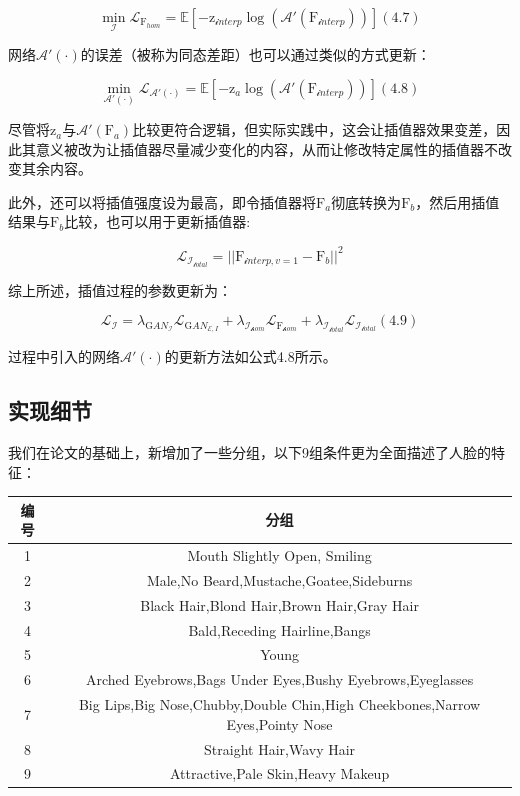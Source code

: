 \documentclass[UTF8,a4paper，12pt]{article}
\def\MC {\mathcal}
\theoremstyle{theorem}
\theoremstyle{definition}
\begin{document}
$$\min_ {\MC I} \MC L_{\mathrm F_{hom}} = \mathbb E [-\mathrm z_{\MC interp}\log(\MC A'(\mathrm F_{\MC interp}))]    (4.7)$$

网络$\MC A'(\cdot)$的误差（被称为同态差距）也可以通过类似的方式更新：

$$\min_ {\MC A'(\cdot)} \MC L_{\MC A'(\cdot)} = \mathbb E [-\mathrm z_a\log(\MC A'(\mathrm F_{\MC interp}))]    (4.8)$$

尽管将$\mathrm z_a$与$\MC A'(\mathrm F_a)$比较更符合逻辑，但实际实践中，这会让插值器效果变差，因此其意义被改为让插值器尽量减少变化的内容，从而让修改特定属性的插值器不改变其余内容。

此外，还可以将插值强度设为最高，即令插值器将$\mathrm F_a$彻底转换为$\mathrm F_b$，然后用插值结果与$\mathrm F_b$比较，也可以用于更新插值器:

$$\MC L_{\MC I_{\MC total}} = ||\mathrm F_{\MC interp,v=1} - \mathrm F_b||^2$$

综上所述，插值过程的参数更新为：

$$\MC L_{\MC I} = \lambda_{\mathrm GAN_{\MC I}}\MC L_{\mathrm GAN_{\MC E,I}} + \lambda_{\MC I_{\MC hom}}\MC L_{\mathrm F_{\MC hom}} + \lambda_{\MC I_{\MC total}}\MC L_{\MC I_{\MC total}}    (4.9)$$

过程中引入的网络$\MC A'(\cdot)$的更新方法如公式4.8所示。

\subsection{实现细节}

我们在论文的基础上，新增加了一些分组，以下9组条件更为全面描述了人脸的特征：

\begin{tabular}{c|c}
  编号 & 分组 \\
  \hline
  1 & Mouth Slightly Open, Smiling \\
  2 & Male,No Beard,Mustache,Goatee,Sideburns \\
 3 & Black Hair,Blond Hair,Brown Hair,Gray Hair\\
 4 & Bald,Receding Hairline,Bangs\\
 5 & Young\\
 6 & Arched Eyebrows,Bags Under Eyes,Bushy Eyebrows,Eyeglasses\\
 7 & Big Lips,Big Nose,Chubby,Double Chin,High Cheekbones,Narrow Eyes,Pointy Nose\\
 8 & Straight Hair,Wavy Hair\\
 9 & Attractive,Pale Skin,Heavy Makeup
\end{tabular}
\end{document}
